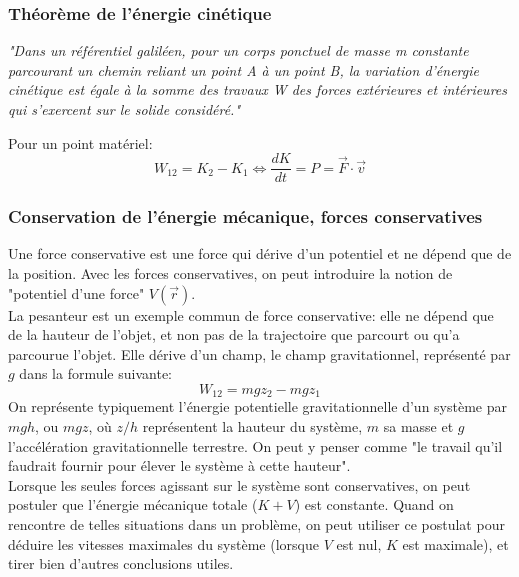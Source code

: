 \documentclass{article}
\numberwithin{equation}{section}
\begin{document}
\subsubsection{Théorème de l'énergie cinétique}
\begin{center}
	\emph{"Dans un référentiel galiléen, pour un corps ponctuel de masse m constante parcourant un chemin reliant un point A à un point B, la variation d'énergie cinétique est égale à la somme des travaux W des forces extérieures et intérieures qui s'exercent sur le solide considéré."}
\end{center}
Pour un point matériel:
\begin{equation}
	\boxed{ W_{12} = K_2 - K_1 \Leftrightarrow \frac{dK}{dt} = P = \vec F \cdot \vec v }
\end{equation}

\subsubsection{Conservation de l'énergie mécanique, forces conservatives}
Une force conservative est une force qui dérive d'un potentiel et ne dépend que de la position. Avec les forces conservatives, on peut introduire la notion de "potentiel d'une force" \(V(\vec r)\). \\

La pesanteur est un exemple commun de force conservative: elle ne dépend que de la hauteur de l'objet, et non pas de la trajectoire que parcourt ou qu'a parcourue l'objet. Elle dérive d'un champ, le champ gravitationnel, représenté par \(g\) dans la formule suivante:
\begin{equation}
	W_{12} = mgz_2 - mgz_1
\end{equation}
On représente typiquement l'énergie potentielle gravitationnelle d'un système par \(mgh\), ou \(mgz\), où \(z/h\) représentent la hauteur du système, \(m\) sa masse et \(g\) l'accélération gravitationnelle terrestre. On peut y penser comme "le travail qu'il faudrait fournir pour élever le système à cette hauteur". \\

Lorsque les seules forces agissant sur le système sont conservatives, on peut postuler que l'énergie mécanique totale (\(K + V\)) est constante. Quand on rencontre de telles situations dans un problème, on peut utiliser ce postulat pour déduire les vitesses maximales du système (lorsque \(V\) est nul, \(K\) est maximale), et tirer bien d'autres conclusions utiles. \\
\end{document}
